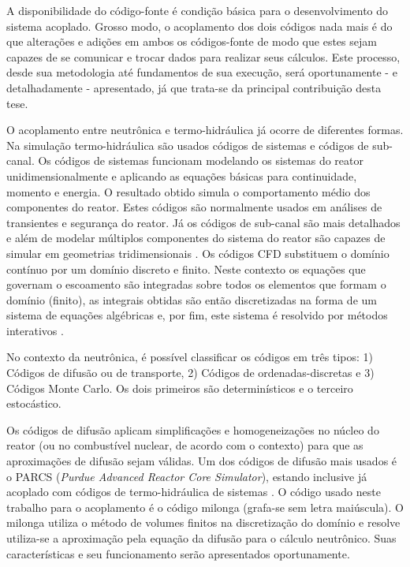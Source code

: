 A disponibilidade do código-fonte é condição básica para o desenvolvimento do sistema acoplado. Grosso modo, o acoplamento
dos dois códigos nada mais é do que alterações e adições em ambos os códigos-fonte de modo
que estes sejam capazes de se comunicar e trocar dados para realizar seus cálculos.
Este processo, desde sua metodologia até fundamentos de sua execução, será
oportunamente - e detalhadamente - apresentado, já que trata-se da principal
contribuição desta tese.

O acoplamento entre neutrônica e termo-hidráulica já ocorre de diferentes formas. Na simulação 
termo-hidráulica são usados códigos de sistemas e códigos de sub-canal. Os códigos de sistemas 
funcionam modelando os sistemas do reator unidimensionalmente e aplicando as equações básicas 
para continuidade, momento e energia. O resultado obtido simula o
comportamento médio dos componentes do reator.
Estes códigos são normalmente usados em análises de transientes e segurança do reator. 
Já os códigos de sub-canal são mais detalhados e além
de modelar múltiplos componentes do sistema 
do reator são capazes de simular em geometrias tridimensionais \cite{Faghihi2011}. Os códigos 
CFD substituem o domínio contínuo por um domínio discreto e finito. Neste contexto os equações 
que governam o escoamento são integradas sobre todos os elementos que formam o domínio (finito), 
as integrais obtidas são então discretizadas na forma de um sistema de equações algébricas 
e, por fim, este sistema é resolvido por métodos interativos \cite{Versteeg2007}.

No contexto da neutrônica, é possível classificar os códigos em três tipos:
1) Códigos de difusão ou de transporte, 
2) Códigos de ordenadas-discretas e 3) Códigos Monte Carlo. Os dois primeiros são determinísticos 
e o terceiro estocástico. 

Os códigos de difusão aplicam simplificações e homogeneizações no núcleo do reator (ou no combustível nuclear, 
de acordo com o contexto) para que as aproximações de difusão sejam válidas. Um dos códigos de difusão 
mais usados é o PARCS (\textit{Purdue Advanced Reactor Core Simulator}), estando inclusive já acoplado 
com códigos de termo-hidráulica de sistemas \cite{Xu2006,Barber98}.
O código usado neste trabalho para o acoplamento é o código milonga (grafa-se sem letra maiúscula). O milonga \cite{Theler2015}
utiliza o método de volumes finitos na discretização do domínio e resolve utiliza-se a
aproximação pela equação da difusão para o cálculo neutrônico. Suas características e seu
funcionamento serão apresentados oportunamente.

